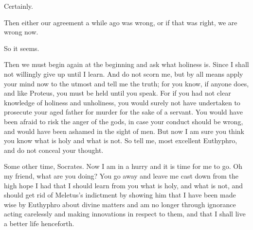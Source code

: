 \documentclass[letterpaper,12pt]{article}
\newcommand{\stephpag}[1]{\marginnote{\small\itshape\fontfamily{ppl}\selectfont #1}}
\begin{document}
\begin{drama}
\euthyphrospeaks
Certainly.

\socratesspeaks
Then either our agreement a while ago was wrong, or if that was right, we are wrong now.

\euthyphrospeaks
So it seems.

\socratesspeaks
Then we must begin again at the beginning and ask what holiness is. Since I shall not willingly give up until I learn. \stephpag{d} And do not scorn me, but by all means apply your mind now to the utmost and tell me the truth; for you know, if anyone does, and like Proteus, you must be held until you speak. For if you had not clear knowledge of holiness and unholiness, you would surely not have undertaken to prosecute your aged father for murder for the sake of a servant. You would have been afraid to risk the anger of the gods, in case your conduct should be wrong, and would have been ashamed in the sight of men. But now I am sure \stephpag{e} you think you know what is holy and what is not. So tell me, most excellent Euthyphro, and do not conceal your thought.

\euthyphrospeaks
Some other time, Socrates. Now I am in a hurry and it is time for me to go.
\clearpage
\socratesspeaks
Oh my friend, what are you doing? You go away and leave me cast down from the high hope I had that I should learn from you what is holy, and what is not, and should get rid of Meletus's indictment by showing him \stephpag{16 a} that I have been made wise by Euthyphro about divine matters and am no longer through ignorance acting carelessly and making innovations in respect to them, and that I shall live a better life henceforth.
\end{drama}
\end{document}
